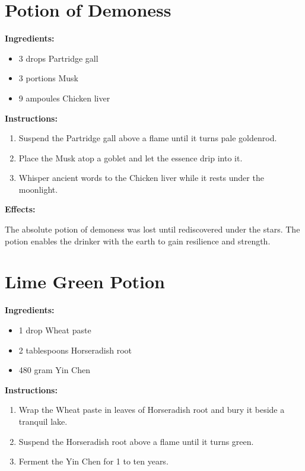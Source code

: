 \documentclass{article}
\begin{document}
\newpage
\section*{Potion of Demoness}

\textbf{Ingredients:}

\begin{itemize}
  \item 3 drops Partridge gall
  \item 3 portions Musk
  \item 9 ampoules Chicken liver
\end{itemize}

\textbf{Instructions:}

\begin{enumerate}
  \item Suspend the Partridge gall above a flame until it turns pale goldenrod.
  \item Place the Musk atop a goblet and let the essence drip into it.
  \item Whisper ancient words to the Chicken liver while it rests under the moonlight.
\end{enumerate}

\textbf{Effects:}

The absolute potion of demoness was lost until rediscovered under the stars. The potion enables the drinker with the earth to gain resilience and strength.

\newpage
\section*{Lime Green Potion}

\textbf{Ingredients:}

\begin{itemize}
  \item 1 drop Wheat paste
  \item 2 tablespoons Horseradish root
  \item 480 gram Yin Chen
\end{itemize}

\textbf{Instructions:}

\begin{enumerate}
  \item Wrap the Wheat paste in leaves of Horseradish root and bury it beside a tranquil lake.
  \item Suspend the Horseradish root above a flame until it turns green.
  \item Ferment the Yin Chen for 1 to ten years.
\end{enumerate}
\end{document}
